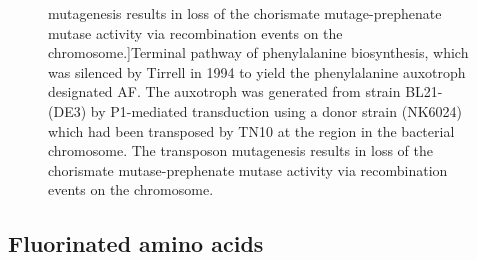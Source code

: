 \begin{refsection}
\begin{figure}[h!]
        mutagenesis results in loss of the chorismate mutage-prephenate mutase
        activity via recombination events on the
chromosome.]{Terminal pathway
        of phenylalanine biosynthesis,\cite{Im1971} which was silenced by
        Tirrell  in 1994 to yield the phenylalanine auxotroph
        designated AF.\cite{Yoshikawa1994} The auxotroph was generated from
         strain BL21-(DE3) by P1-mediated transduction using a
        donor strain (NK6024) which had been transposed by TN10 at the
         region in the bacterial chromosome.  The transposon
        mutagenesis results in loss of the chorismate mutase-prephenate mutase
        activity via recombination events on the
chromosome.}\label{fig:chorismate_pathway} \end{figure}
\subsection{Fluorinated amino acids}
\label{sec:fluorinated_amino_acids}



\end{refsection}

